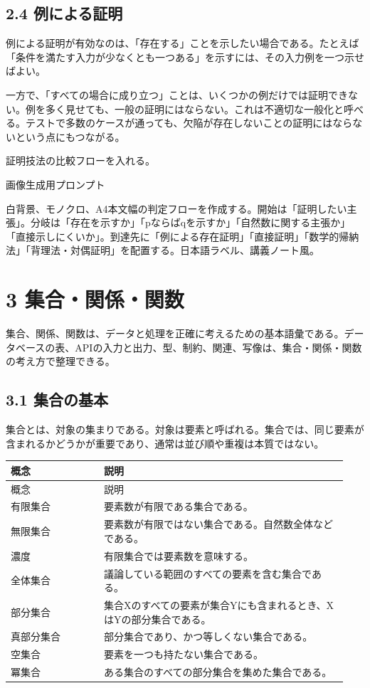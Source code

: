 \documentclass[uplatex,dvipdfmx,a4paper,10pt]{jsarticle}
\begin{document}
\subsection{2.4 例による証明}
例による証明が有効なのは、「存在する」ことを示したい場合である。たとえば「条件を満たす入力が少なくとも一つある」を示すには、その入力例を一つ示せばよい。

一方で、「すべての場合に成り立つ」ことは、いくつかの例だけでは証明できない。例を多く見せても、一般の証明にはならない。これは不適切な一般化と呼べる。テストで多数のケースが通っても、欠陥が存在しないことの証明にはならないという点にもつながる。

\begin{todobox}
証明技法の比較フローを入れる。

画像生成用プロンプト

白背景、モノクロ、A4本文幅の判定フローを作成する。開始は「証明したい主張」。分岐は「存在を示すか」「pならばqを示すか」「自然数に関する主張か」「直接示しにくいか」。到達先に「例による存在証明」「直接証明」「数学的帰納法」「背理法・対偶証明」を配置する。日本語ラベル、講義ノート風。
\end{todobox}
\section{3 集合・関係・関数}
集合、関係、関数は、データと処理を正確に考えるための基本語彙である。データベースの表、APIの入力と出力、型、制約、関連、写像は、集合・関係・関数の考え方で整理できる。

\subsection{3.1 集合の基本}
集合とは、対象の集まりである。対象は要素と呼ばれる。集合では、同じ要素が含まれるかどうかが重要であり、通常は並び順や重複は本質ではない。

\begin{longtable}{>{\raggedright\arraybackslash}p{0.26\linewidth} >{\raggedright\arraybackslash}p{0.68\linewidth}}
\toprule
概念 & 説明 \\
\midrule
\endfirsthead
\toprule
概念 & 説明 \\
\midrule
\endhead
有限集合 & 要素数が有限である集合である。 \\
無限集合 & 要素数が有限ではない集合である。自然数全体などである。 \\
濃度 & 有限集合では要素数を意味する。 \\
全体集合 & 議論している範囲のすべての要素を含む集合である。 \\
部分集合 & 集合Xのすべての要素が集合Yにも含まれるとき、XはYの部分集合である。 \\
真部分集合 & 部分集合であり、かつ等しくない集合である。 \\
空集合 & 要素を一つも持たない集合である。 \\
冪集合 & ある集合のすべての部分集合を集めた集合である。 \\
\bottomrule
\end{longtable}
\end{document}
